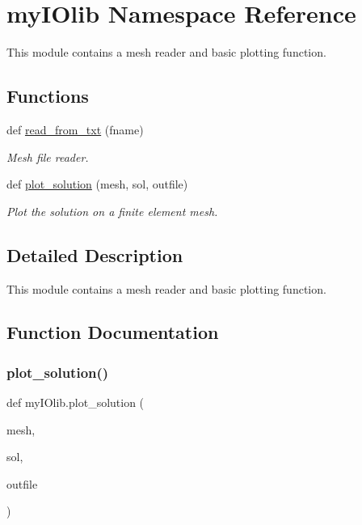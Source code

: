 \hypertarget{namespacemyIOlib}{}\section{my\+I\+Olib Namespace Reference}
\label{namespacemyIOlib}


This module contains a mesh reader and basic plotting function.  


\subsection*{Functions}
\begin{DoxyCompactItemize}
\item 
def \mbox{\hyperlink{namespacemyIOlib_a32ff0df3100e4b492bdd062d83ecda0a}{read\+\_\+from\+\_\+txt}} (fname)
\begin{DoxyCompactList}\small\item\em Mesh file reader. \end{DoxyCompactList}\item 
def \mbox{\hyperlink{namespacemyIOlib_abe296d601f511f73de654b5fb4137ae4}{plot\+\_\+solution}} (mesh, sol, outfile)
\begin{DoxyCompactList}\small\item\em Plot the solution on a finite element mesh. \end{DoxyCompactList}\end{DoxyCompactItemize}


\subsection{Detailed Description}
This module contains a mesh reader and basic plotting function. 

\subsection{Function Documentation}
\mbox{\label{namespacemyIOlib_abe296d601f511f73de654b5fb4137ae4}} 
\subsubsection{\texorpdfstring{plot\+\_\+solution()}{plot\_solution()}}
{\footnotesize\ttfamily def my\+I\+Olib.\+plot\+\_\+solution (\begin{DoxyParamCaption}\item[{}]{mesh,  }\item[{}]{sol,  }\item[{}]{outfile }\end{DoxyParamCaption})}



